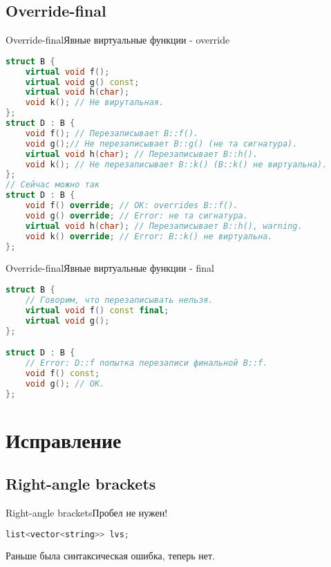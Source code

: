 \documentclass[10pt]{beamer}
\begin{document}
\subsection{Override-final}
\hypertarget{Override-final}{}
\begin{frame}[fragile]{Override-final}{Явные виртуальные функции - override}
\begin{lstlisting}[language=C++]
struct B {
    virtual void f();
    virtual void g() const;
    virtual void h(char);
    void k(); // Не вирутальная.
};
struct D : B {
    void f(); // Перезаписывает B::f().
    void g();// Не перезаписывает B::g() (не та сигнатура).
    virtual void h(char); // Перезаписывает B::h().
    void k(); // Не перезаписывает B::k() (B::k() не виртуальна).
};
// Сейчас можно так
struct D : B {
    void f() override; // OK: overrides B::f().
    void g() override; // Error: не та сигнатура.
    virtual void h(char); // Перезаписывает B::h(), warning.
    void k() override; // Error: B::k() не виртуальна.
};
\end{lstlisting}
\end{frame}
\begin{frame}[fragile]{Override-final}{Явные виртуальные функции - final}
\begin{lstlisting}[language=C++]
struct B {
    // Говорим, что перезаписывать нельзя.
    virtual void f() const final; 
    virtual void g();
};

struct D : B {
    // Error: D::f попытка перезаписи финальной B::f.
    void f() const; 
    void g(); // OK.
};
\end{lstlisting}
\end{frame}



\section{Исправление}

\subsection{Right-angle brackets}
\begin{frame}[fragile]{Right-angle brackets}{Пробел не нужен!}
\begin{lstlisting}[language=C++]
list<vector<string>> lvs;
\end{lstlisting}
Раньше была синтаксическая ошибка, теперь нет.
\end{frame}

\appendix
\end{document}
